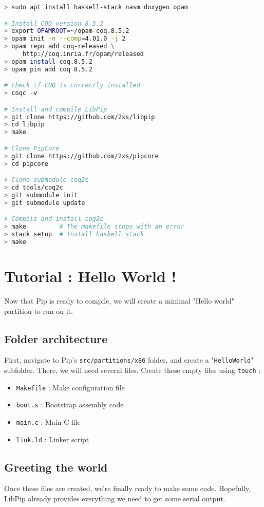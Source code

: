 \documentclass[10pt,a4paper,titlepage]{refart}
\begin{document}
\begin{lstlisting}[language=bash]
> sudo apt install haskell-stack nasm doxygen opam

# Install COQ version 8.5.2
> export OPAMROOT=~/opam-coq.8.5.2
> opam init -n --comp=4.01.0 -j 2
> opam repo add coq-released \
     http://coq.inria.fr/opam/released
> opam install coq.8.5.2
> opam pin add coq 8.5.2

# check if COQ is correctly installed
> coqc -v

# Install and compile LibPip
> git clone https://github.com/2xs/libpip
> cd libpip
> make

# Clone PipCore
> git clone https://github.com/2xs/pipcore
> cd pipcore

# Clone submodule coq2c
> cd tools/coq2c
> git submodule init 
> git submodule update

# Compile and install coq2c 
> make         # The makefile stops with an error
> stack setup  # Install haskell stack
> make 
\end{lstlisting}

\section{Tutorial : Hello World !}
Now that Pip is ready to compile, we will create a minimal "Hello world" partition to run on it.

\subsection{Folder architecture}
First, navigate to Pip's \texttt{src/partitions/x86} folder, and create a "\texttt{HelloWorld}" subfolder.
There, we will need several files. Create these empty files using \texttt{touch} :
\begin{itemize}
\item \texttt{Makefile} : Make configuration file
\item \texttt{boot.s} : Bootstrap assembly code
\item \texttt{main.c} : Main C file
\item \texttt{link.ld} : Linker script
\end{itemize}

\subsection{Greeting the world}
Once these files are created, we're finally ready to make some code. Hopefully, LibPip already provides everything we need to get some serial output.
\end{document}
